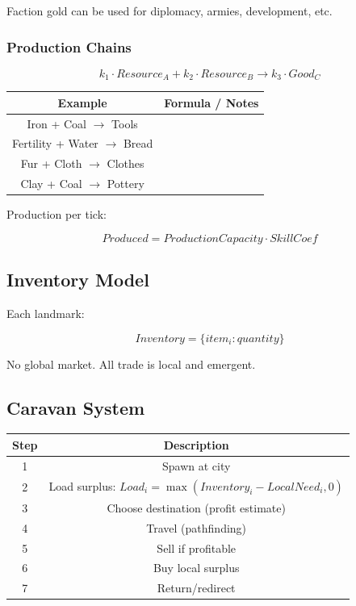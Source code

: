 \documentclass[a4paper,12pt]{article}
\begin{document}
Faction gold can be used for diplomacy, armies, development, etc.



\subsubsection{Production Chains}

\begin{equation}
k_1 \cdot Resource_A + k_2 \cdot Resource_B 
\rightarrow 
k_3 \cdot Good_C
\end{equation}

\begin{table}[H]
\centering
\begin{tabular}{|c|c|}
\hline
Example & Formula / Notes \\
\hline
Iron + Coal $\rightarrow$ Tools &  \\
Fertility + Water $\rightarrow$ Bread &  \\
Fur + Cloth $\rightarrow$ Clothes &  \\
Clay + Coal $\rightarrow$ Pottery &  \\
\hline
\end{tabular}
\end{table}

Production per tick:

\begin{equation}
Produced = ProductionCapacity \cdot SkillCoef
\end{equation}



\subsection{Inventory Model}

Each landmark:

\begin{equation}
Inventory = \{ item_i : quantity \}
\end{equation}

No global market. All trade is local and emergent.



\subsection{Caravan System}

\begin{table}[H]
\centering
\begin{tabular}{|c|c|}
\hline
Step & Description \\
\hline
1 & Spawn at city \\
2 & Load surplus: $Load_i = \max(Inventory_i - LocalNeed_i, 0)$ \\
3 & Choose destination (profit estimate) \\
4 & Travel (pathfinding) \\
5 & Sell if profitable \\
6 & Buy local surplus \\
7 & Return/redirect \\
\hline
\end{tabular}
\end{table}
\end{document}
